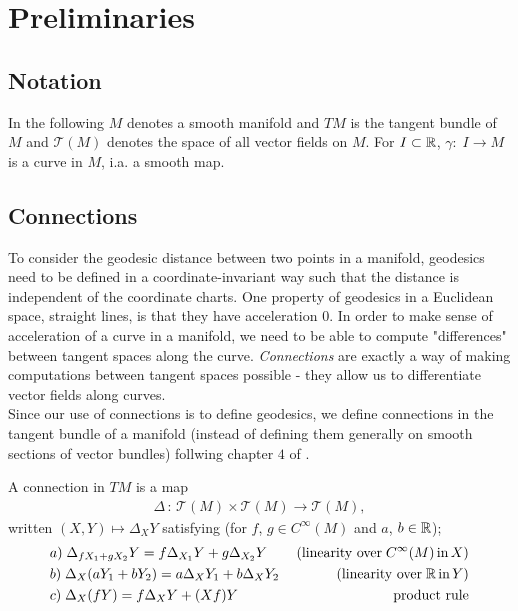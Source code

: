 \chapter{Preliminaries}

\section{Notation}

In the following $M$ denotes a smooth manifold and $TM$ is the tangent bundle of $M$ and $\mathcal{T}(M)$ denotes the space of all vector fields on $M$. For $I \subset \mathbb{R}$, $\gamma: \; I \rightarrow M$ is a curve in $M$, i.a. a smooth map.  

\section{Connections}

To consider the geodesic distance between two points in a manifold, geodesics need to be defined in a coordinate-invariant way such that the distance is independent of the coordinate charts. One property of geodesics in a Euclidean space, straight lines, is that they have acceleration $0$. In order to make sense of acceleration of a curve in a manifold, we need to be able to compute "differences" between tangent spaces along the curve. \textit{Connections} are exactly a way of making computations between tangent spaces possible - they allow us to differentiate vector fields along curves.\\[0.2 cm]
Since our use of connections is to define geodesics, we define connections in the tangent bundle of a manifold (instead of defining them generally on smooth sections of vector bundles) follwing chapter $4$ of \citet{RiemannLee}. 

\begin{definition}
A connection in $TM$ is a map
\begin{align*}
\Delta \, : \, \mathcal{T}(M) \times \mathcal{T}(M) \rightarrow \mathcal{T}(M),
\end{align*}
written $(X, Y) \mapsto \Delta_X Y$ satisfying (for $f$, $g \in C^\infty(M)$ and $a$, $b \in \mathbb{R}$);
\begin{align*}
& a) \; \Delta_{fX_1 + gX_2} Y = f\Delta_{X_1} Y + g\Delta_{X_2} Y \; \; \; \; & \text{(linearity over} \; C^\infty(M) \, \text{in} \, X) \\
& b) \; \Delta_X (aY_1 + bY_2) = a\Delta_X Y_1 + b\Delta_X Y_2 & \text{(linearity over} \; \mathbb{R} \, \text{in} \, Y) \\
& c) \; \Delta_X (fY) = f\Delta_X Y + (Xf)Y & \text{product rule}
\end{align*}
\end{definition}

